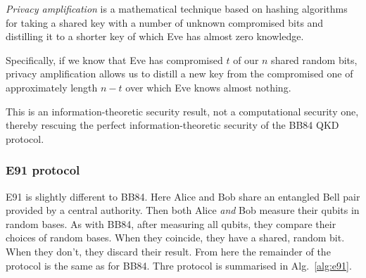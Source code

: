 \textit{Privacy amplification} is a mathematical technique based on hashing algorithms for taking a shared key with a number of unknown compromised bits and distilling it to a shorter key of which Eve has almost zero knowledge.

Specifically, if we know that Eve has compromised $t$ of our $n$ shared random bits, privacy amplification allows us to distill a new key from the compromised one of approximately length \mbox{$n-t$} over which Eve knows almost nothing.

This is an information-theoretic security result, not a computational security one, thereby rescuing the perfect information-theoretic security of the BB84 QKD protocol.

%
%

\subsubsection{E91 protocol}

E91 is slightly different to BB84. Here Alice and Bob share an entangled Bell pair provided by a central authority. Then both Alice \textit{and} Bob measure their qubits in random bases. As with BB84, after measuring all qubits, they compare their choices of random bases. When they coincide, they have a shared, random bit. When they don't, they discard their result. From here the remainder of the protocol is the same as for BB84. Thre protocol is summarised in Alg.~\ref{alg:e91}.


